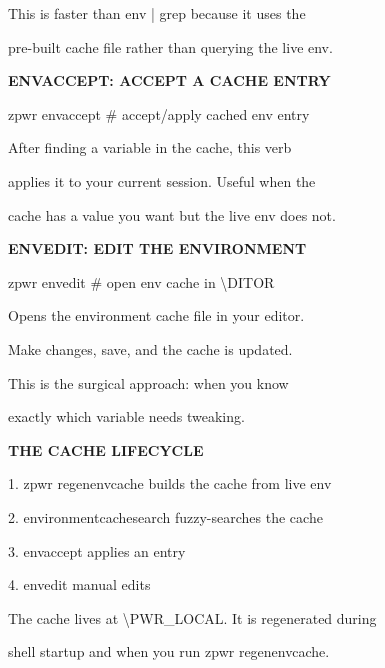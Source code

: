 \documentclass[11pt,a4paper,twoside]{book}
\begin{document}
This is faster than env | grep because it uses the

pre-built cache file rather than querying the live env.


\vspace{12pt}
{\bfseries\color{neonyellow} ENVACCEPT: ACCEPT A CACHE ENTRY}\vspace{4pt}

\begin{codebox}
zpwr envaccept                      \# accept/apply cached env entry\\
\end{codebox}

After finding a variable in the cache, this verb

applies it to your current session. Useful when the

cache has a value you want but the live env does not.


\vspace{12pt}
{\bfseries\color{neonyellow} ENVEDIT: EDIT THE ENVIRONMENT}\vspace{4pt}

\begin{codebox}
zpwr envedit                        \# open env cache in \textbackslash{}DITOR\\
\end{codebox}

Opens the environment cache file in your editor.

Make changes, save, and the cache is updated.

This is the surgical approach: when you know

exactly which variable needs tweaking.


\vspace{12pt}
{\bfseries\color{neonyellow} THE CACHE LIFECYCLE}\vspace{4pt}

1. zpwr regenenvcache   builds the cache from live env

2. environmentcachesearch fuzzy-searches the cache

3. envaccept             applies an entry

4. envedit               manual edits

The cache lives at \textbackslash{}PWR\_LOCAL. It is regenerated during

\begin{codebox}
shell startup and when you run zpwr regenenvcache.\\
\end{codebox}
\end{document}
